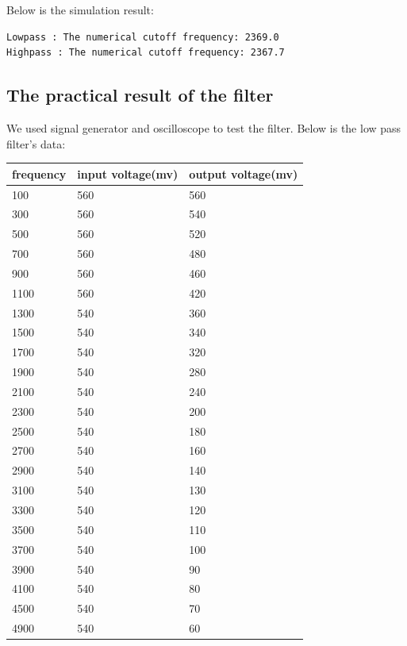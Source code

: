 \documentclass[11pt]{scrartcl}
\begin{document}
 Below is the simulation result:
\begin{verbatim}
Lowpass : The numerical cutoff frequency: 2369.0
Highpass : The numerical cutoff frequency: 2367.7
\end{verbatim}
\subsection{The practical result of the filter}
We used signal generator and oscilloscope to test the filter. 
Below is the low pass filter's data:\\
\begin{center}
\begin{tabular}{|l|l|l|}
\hline
frequency&input voltage(mv)&output voltage(mv)\\\hline
100&560&560\\\hline
300&560&540\\\hline
500&560&520\\\hline
700&560&480\\\hline
900&560&460\\\hline
1100&560&420\\\hline
1300&540&360\\\hline
1500&540&340\\\hline
1700&540&320\\\hline
1900&540&280\\\hline
2100&540&240\\\hline
2300&540&200\\\hline
2500&540&180\\\hline
2700&540&160\\\hline
2900&540&140\\\hline
3100&540&130\\\hline
3300&540&120\\\hline
3500&540&110\\\hline
3700&540&100\\\hline
3900&540&90\\\hline
4100&540&80\\\hline
4500&540&70\\\hline
4900&540&60\\\hline
\end{tabular}
\end{center}
\end{document}
